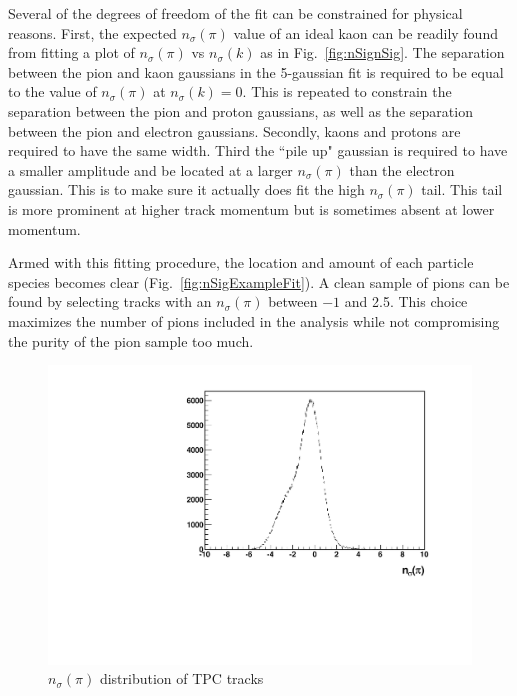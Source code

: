 \documentclass[letterpaper, abstract = on,listof=totoc, bibliography=totoc]{scrreprt}
\begin{document}
Several of the degrees of freedom of the fit can be constrained for physical reasons. First, the expected $n_\sigma(\pi)$ value of an ideal kaon can be readily found from fitting a plot of $n_\sigma(\pi)$ vs $n_\sigma(k)$ as in Fig.~\ref{fig:nSignSig}. The separation between the pion and kaon gaussians in the 5-gaussian fit is required to be equal to the value of $n_\sigma(\pi)$ at $n_\sigma(k) = 0$. This is repeated to constrain the separation between the pion and proton gaussians, as well as the separation between the pion and electron gaussians. Secondly, kaons and protons are required to have the same width. Third the ``pile up" gaussian is required to have a smaller amplitude and be located at a larger $n_\sigma(\pi)$ than the electron gaussian. This is to make sure it actually does fit the high $n_\sigma(\pi)$ tail. This tail is more prominent at higher track momentum but is sometimes absent at lower momentum.  

Armed with this fitting procedure, the location and amount of each particle species becomes clear (Fig.~\ref{fig:nSigExampleFit}). A clean sample of pions can be found by selecting tracks with an $n_\sigma(\pi)$ between $-1$ and 2.5. This choice maximizes the number of pions included in the analysis while not compromising the purity of the pion sample too much.  


         
 \begin{figure}
\begin{center}
\includegraphics[width = .7\textwidth]{histogramExample.pdf}
\caption[$n_\sigma(\pi)$ distribution]{$n_\sigma(\pi)$ distribution of TPC tracks}
\label{fig:nSigExample}
\end{center}
\end{figure}
\end{document}
